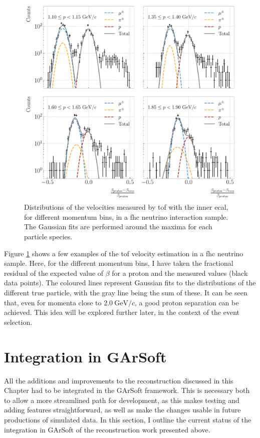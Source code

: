 \begin{figure}[t]
	\centering
	\includegraphics[width=.95\linewidth]{Images/GArSoft_PID/tof/numu_cc_proton_tof_summary.pdf}
	\caption{Distributions of the velocities measured by \gls{tof} with the
	inner \gls{ecal}, for different momentum bins, in a \gls{fhc} neutrino interaction sample. The Gaussian fits are performed around the maxima for each particle species.}
	\label{fig:tof_beta_fhc}
\end{figure}

Figure \ref{fig:tof_beta_fhc} shows a few examples of the \gls{tof} velocity estimation in a \gls{fhc} neutrino sample. Here, for the different momentum bins, I have taken the fractional residual of the expected value of $\beta$ for a proton and the measured values (black data points). The coloured lines represent Gaussian fits to the distributions of the different true particle, with the gray line being the sum of these. It can be seen that, even for momenta close to $2.0~\mathrm{GeV}/c$, a good proton separation can be achieved. This idea will be explored further later, in the context of the event selection.

\section{Integration in GArSoft}\label{section:integration}

All the additions and improvements to the reconstruction discussed in this Chapter had to be integrated in the GArSoft framework. This is necessary both to allow a more streamlined path for development, as this makes testing and adding features straightforward, as well as make the changes usable in future productions of simulated data. In this section, I outline the current status of the integration in GArSoft of the reconstruction work presented above.

